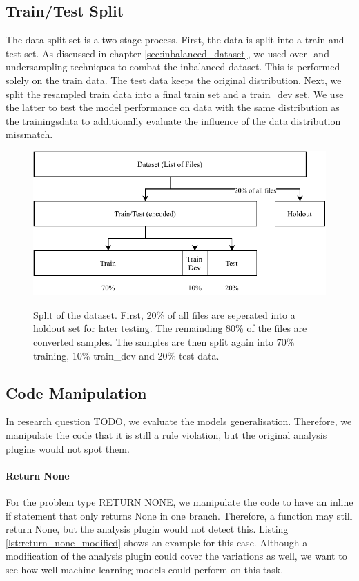 \subsection{Train/Test Split}
The data split set is a two-stage process. 
First, the data is split into a train and test set. As discussed in chapter \ref{sec:inbalanced_dataset}, we used over- and undersampling techniques to combat the inbalanced dataset. This is performed solely on the train data. The test data keeps the original distribution. Next, we split the resampled train data into a final train set and a train\_dev set. We use the latter to test the model performance on data with the same distribution as the trainingsdata to additionally evaluate the influence of the data distribution missmatch.

\begin{figure}
    \includegraphics[width=1\textwidth]{img/ML/Data_split.pdf}
    \label{fig:data_split}
    \caption{Split of the dataset. First, 20\% of all files are seperated into a holdout set for later testing. The remainding 80\% of the files are converted samples. The samples are then split again into 70\% training, 10\% train\_dev and 20\% test data. }
\end{figure}

\subsection{Code Manipulation}
In research question TODO, we evaluate the models generalisation. Therefore, we manipulate the code that it is still a rule violation, but the original analysis plugins would not spot them. 

\paragraph{Return None}\label{par:manipulation_return_none}
For the problem type RETURN NONE, we manipulate the code to have an inline if statement that only returns None in one branch. Therefore, a function may still return None, but the analysis plugin would not detect this. Listing \ref{lst:return_none_modified} shows an example for this case. Although a modification of the analysis plugin could cover the variations as well, we want to see how well machine learning models could perform on this task.

